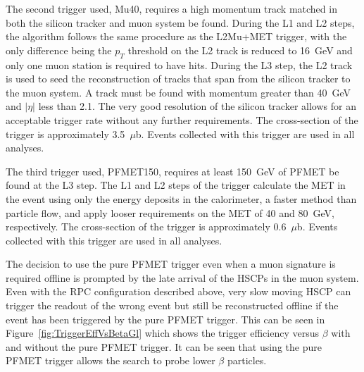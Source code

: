 The second trigger used, Mu40, requires a high momentum track matched in both the silicon tracker and muon system be found.
During the L1 and L2 steps, the algorithm follows the same procedure as the L2Mu+MET trigger, with the only difference being the $p_T$ threshold on the L2 track
is reduced to 16~GeV and only one muon station is required to have hits.
During the L3 step, the L2 track is used to seed the reconstruction of tracks that span from the silicon tracker to the muon system.
A track must be found with momentum greater than 40~GeV and $|\eta|$ less than 2.1. The very good resolution of the silicon tracker allows for an acceptable trigger rate
without any further requirements. 
The cross-section of the trigger is approximately 3.5~$\mu$b.
Events collected with this trigger are used in all analyses.

The third trigger used, PFMET150, requires at least 150~GeV of PFMET be found at the L3 step. The L1 and L2 steps of the trigger calculate the MET in the event using
only the energy deposits in the calorimeter, a faster method than particle flow, and apply looser requirements on the MET of 40 and 80~GeV, respectively.
The cross-section of the trigger is approximately 0.6~$\mu$b.
Events collected with this trigger are used in all analyses.

The decision to use the pure PFMET trigger even when a muon signature is required offline is prompted by the late arrival of the HSCPs in the muon system.
Even with the RPC configuration described above, very slow moving HSCP can trigger the readout of the wrong event but still be reconstructed offline
if the event has been triggered by the pure PFMET trigger. This can be seen in Figure~\ref{fig:TriggerEffVsBetaGl} which shows the trigger efficiency versus $\beta$
with and without the pure PFMET trigger.
It can be seen that using the pure PFMET trigger allows the search to probe lower $\beta$ particles. 



